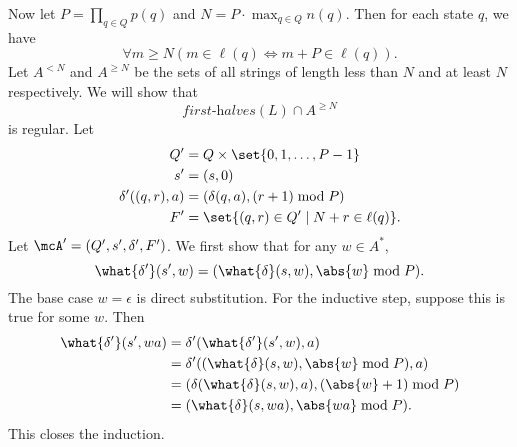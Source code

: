 \documentclass[12pt]{article}
\newcommand\firsthalf{\textit{first-halves}}
\begin{document}
\begin{solution}
    Now let $P = \prod_{q \in Q} p(q)$ and
    $N = P \cdot \max_{q \in Q} n(q)$.
    Then for each state $q$, we have \[
        \forall m \ge N (m \in \ell(q) \iff m+P \in \ell(q)).
    \]
    Let $A^{<N}$ and $A^{\ge N}$ be the sets of all strings of length
    less than $N$ and at least $N$ respectively.
    We will show that \[
        \firsthalf(L) \cap A^{\ge N}
    \] is regular.
    Let \begin{align*}
        Q' &= Q \times \set{0, 1, \dots, P-1} \\
        s' &= (s, 0) \\
        \delta'((q, r), a) &= (\delta(q, a), (r+1) \bmod P) \\
        F' &= \set{(q, r) \in Q' \mid N+r \in \ell(q)}.
    \end{align*}
    Let $\mcA' = (Q', s', \delta', F')$.
    We first show that for any $w \in A^*$, \[
        \what{\delta'}(s', w) = (\what{\delta}(s, w), \abs{w} \bmod P).
    \] The base case $w = \epsilon$ is direct substitution.
    For the inductive step, suppose this is true for some $w$.
    Then \begin{align*}
        \what{\delta'}(s', wa) &= \delta'(\what{\delta'}(s', w), a) \\
        &= \delta'((\what{\delta}(s, w), \abs{w} \bmod P), a) \\
        &= (\delta(\what{\delta}(s, w), a), (\abs{w}+1) \bmod P) \\
        &= (\what{\delta}(s, wa), \abs{wa} \bmod P).
    \end{align*}
    This closes the induction.


\end{solution}
\end{document}
